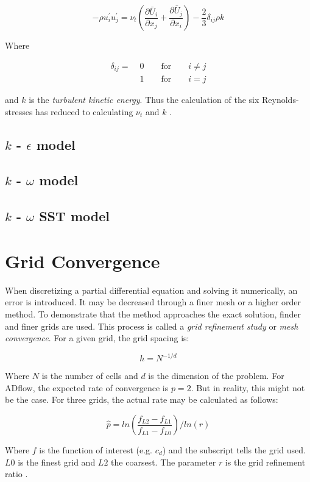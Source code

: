 \begin{equation}
    - \rho u_{i}^{\prime} u_{j}^{\prime} =
    \nu_{t} (\frac{\partial \bar U_{i}}{\partial x_{j}} +
    \frac{\partial \bar U_{j}}{\partial x_{i}}) -
    \frac{2}{3} \delta_{ij} \rho k
    \label{eq:boussinesq}
\end{equation}

\noindent Where

\begin{align*}
    \delta_{ij} = \; &0 \qquad \text{for} \qquad i \neq j \\
    &1 \qquad \text{for} \qquad i = j
\end{align*}

\noindent and $k$ is the \textit{turbulent kinetic energy}. Thus the calculation
of the six Reynolds-stresses has reduced to calculating $\nu_{t}$ and $k$
\cite{leschziner2015statistical}.




\subsection{$k$ - $\epsilon$ model}




\subsection{$k$ - $\omega$ model}




\subsection{$k$ - $\omega$ SST model}


\section{Grid Convergence}
When discretizing a partial differential equation and solving it numerically,
an error is introduced. It may be decreased through a finer mesh or a higher
order method. To demonstrate that the method approaches the exact solution,
finder and finer grids are used. This process is called a \textit{grid
refinement study} or \textit{mesh convergence}. For a given grid, the grid
spacing is:

\begin{equation}
  h = N^{-1/d}
\end{equation}

\noindent Where $N$ is the number of cells and $d$ is the dimension of the
problem.
For ADflow, the expected rate of convergence is $p=2$. But in reality, this
might not be the case. For three grids, the actual rate may be calculated as
follows:

\begin{equation}
  \hat p = ln(\frac{f_{L2} - f_{L1}}{f_{L1} - f_{L0}}) / ln(r)
  \label{eq:conv_rate}
\end{equation}

\noindent Where $f$ is the function of interest (e.g. $c_{d}$) and the subscript
tells the grid used. $L0$ is the finest grid and $L2$ the coarsest. The
parameter $r$ is the grid refinement ratio \cite{grid_refinement}.
